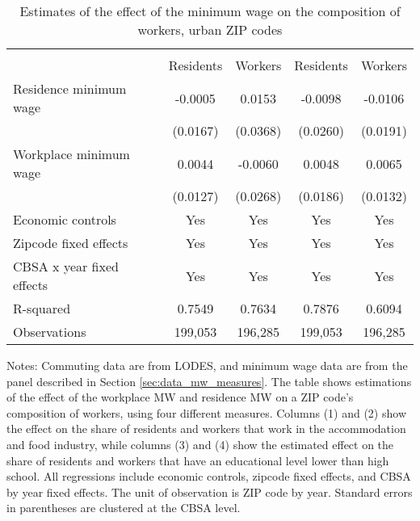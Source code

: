 \begin{table}[hbt!] \centering
    \caption{Estimates of the effect of the minimum wage on the composition of workers, urban ZIP codes}
    \label{tab:share_migration}
    \begin{tabular}{lcccc}
        \toprule 
        &  &  \\ \cmidrule(lr){2-3} \cmidrule(lr){4-5}
                    & Residents & Workers & Residents & Workers \\  \midrule
        Residence minimum wage &  -0.0005  &  0.0153  &  -0.0098  &  -0.0106  \\
                               & (0.0167) & (0.0368) & (0.0260) & (0.0191) \\
        Workplace minimum wage &  0.0044  &  -0.0060  &  0.0048  &  0.0065  \\
                               & (0.0127) & (0.0268) & (0.0186) & (0.0132) \\  \midrule
        Economic controls           &  Yes   &  Yes   &  Yes  &  Yes  \\
        Zipcode fixed effects       &  Yes   &  Yes   &  Yes  &  Yes  \\
        CBSA x year fixed effects   &  Yes   &  Yes   &  Yes  &  Yes  \\
        R-squared                   &  0.7549   &  0.7634   &  0.7876  &  0.6094  \\
        Observations                &  199,053  &  196,285  &  199,053 &  196,285  
        \\\bottomrule
    \end{tabular}
    
    \begin{minipage}{.95\textwidth} \footnotesize
        \vspace{2mm}
        Notes:
        Commuting data are from LODES, and minimum wage 
        data are from the panel described in Section \ref{sec:data_mw_measures}.
        The table shows estimations of the effect of the workplace MW and
        residence MW on a ZIP code's composition of workers, using four different measures. Columns (1) and (2) show the effect on the share of residents and workers that work in the accommodation and food industry, while columns (3) and (4) show the estimated effect on the share of residents and workers that have an educational level lower than high school. 
        All regressions include economic controls, zipcode fixed effects, and CBSA by year fixed effects.
        The unit of observation is ZIP code by year.
        Standard errors in parentheses are clustered at the CBSA level.
    \end{minipage}
\end{table}
